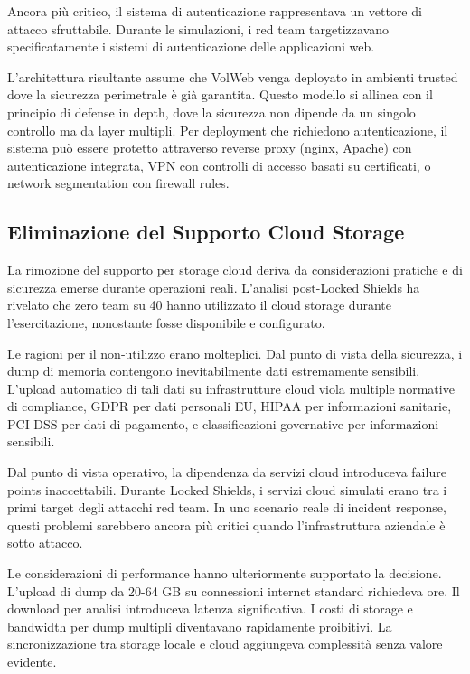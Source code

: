 Ancora più critico, il sistema di autenticazione rappresentava un vettore di attacco sfruttabile. Durante le simulazioni, i red team targetizzavano specificatamente i sistemi di autenticazione delle applicazioni web.

L'architettura risultante assume che VolWeb venga deployato in ambienti trusted dove la sicurezza perimetrale è già garantita. Questo modello si allinea con il principio di defense in depth, dove la sicurezza non dipende da un singolo controllo ma da layer multipli. Per deployment che richiedono autenticazione, il sistema può essere protetto attraverso reverse proxy (nginx, Apache) con autenticazione integrata, VPN con controlli di accesso basati su certificati, o network segmentation con firewall rules.

\subsection{Eliminazione del Supporto Cloud Storage}

La rimozione del supporto per storage cloud deriva da considerazioni pratiche e di sicurezza emerse durante operazioni reali. L'analisi post-Locked Shields ha rivelato che zero team su 40 hanno utilizzato il cloud storage durante l'esercitazione, nonostante fosse disponibile e configurato.

Le ragioni per il non-utilizzo erano molteplici. Dal punto di vista della sicurezza, i dump di memoria contengono inevitabilmente dati estremamente sensibili. L'upload automatico di tali dati su infrastrutture cloud viola multiple normative di compliance, GDPR per dati personali EU, HIPAA per informazioni sanitarie, PCI-DSS per dati di pagamento, e classificazioni governative per informazioni sensibili.

Dal punto di vista operativo, la dipendenza da servizi cloud introduceva failure points inaccettabili. Durante Locked Shields, i servizi cloud simulati erano tra i primi target degli attacchi red team. In uno scenario reale di incident response, questi problemi sarebbero ancora più critici quando l'infrastruttura aziendale è sotto attacco.

Le considerazioni di performance hanno ulteriormente supportato la decisione. L'upload di dump da 20-64 GB su connessioni internet standard richiedeva ore. Il download per analisi introduceva latenza significativa. I costi di storage e bandwidth per dump multipli diventavano rapidamente proibitivi. La sincronizzazione tra storage locale e cloud aggiungeva complessità senza valore evidente.

